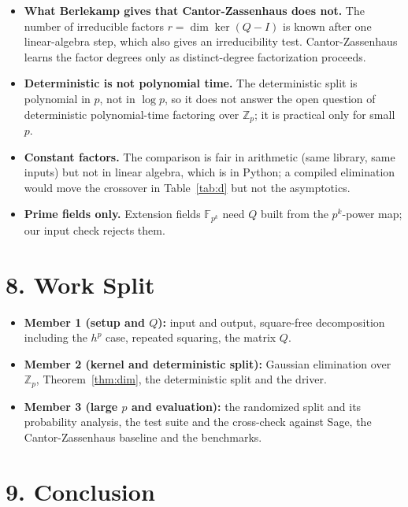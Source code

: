 \documentclass[11pt,a4paper]{article}
\newcommand{\Zp}{\mathbb{Z}_p}
\begin{document}
\begin{itemize}
    \item \textbf{What Berlekamp gives that Cantor-Zassenhaus does not.} The number of irreducible factors $r = \dim\ker(Q - I)$ is known after one linear-algebra step, which also gives an irreducibility test. Cantor-Zassenhaus learns the factor degrees only as distinct-degree factorization proceeds.
    \item \textbf{Deterministic is not polynomial time.} The deterministic split is polynomial in $p$, not in $\log p$, so it does not answer the open question of deterministic polynomial-time factoring over $\Zp$; it is practical only for small $p$.
    \item \textbf{Constant factors.} The comparison is fair in arithmetic (same library, same inputs) but not in linear algebra, which is in Python; a compiled elimination would move the crossover in Table~\ref{tab:d} but not the asymptotics.
    \item \textbf{Prime fields only.} Extension fields $\mathbb{F}_{p^k}$ need $Q$ built from the $p^k$-power map; our input check rejects them.
\end{itemize}

\section*{8. Work Split}

\begin{itemize}
    \item \textbf{Member 1 (setup and $Q$):} input and output, square-free decomposition including the $h^p$ case, repeated squaring, the matrix $Q$.
    \item \textbf{Member 2 (kernel and deterministic split):} Gaussian elimination over $\Zp$, Theorem~\ref{thm:dim}, the deterministic split and the driver.
    \item \textbf{Member 3 (large $p$ and evaluation):} the randomized split and its probability analysis, the test suite and the cross-check against Sage, the Cantor-Zassenhaus baseline and the benchmarks.
\end{itemize}

\section*{9. Conclusion}
\end{document}

